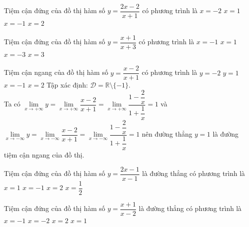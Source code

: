 \begin{ex}%
	Tiệm cận đứng của đồ thị hàm số $y=\dfrac{2x-2}{x+1}$ có phương trình là 
	\choice
	{$x=-2$}
	{$x=1$}
	{\True $x=-1$}
	{$x=2$}
\end{ex}

\begin{ex}%
	Tiệm cận đứng của đồ thị hàm số $y=\dfrac{x+1}{x+3}$ có phương trình là 
	\choice
	{$x=-1$}
	{$x=1$}
	{\True $x=-3$}
	{$x=3$}
\end{ex}


\begin{ex}%
	Tiệm cận ngang của đồ thị hàm số $y=\dfrac{x-2}{x+1}$ có phương trình là
	\choice
	{$y=-2$}
	{\True $y=1$}
	{$x=-1$}
	{$x=2$}
	\loigiai
	{
		Tập xác định: $\mathscr{D}=\mathbb{R}\setminus \{-1\}$.\\
		Ta có $\lim \limits_{x \to +\infty} y=\lim \limits_{x \to +\infty} \dfrac{x-2}{x+1}=\lim \limits_{x \to +\infty} \dfrac{1-\dfrac{2}{x}}{1+\dfrac{1}{x}}=1$ và $\lim \limits_{x \to -\infty} y=\lim \limits_{x \to -\infty} \dfrac{x-2}{x+1}=\lim \limits_{x \to -\infty} \dfrac{1-\dfrac{2}{x}}{1+\dfrac{1}{x}}=1$ nên đường thẳng $y=1$ là đường tiệm cận ngang của đồ thị.
	}
\end{ex}


\begin{ex}%
	Tiệm cận đứng của đồ thị hàm số $ y=\dfrac{2x-1}{x-1}$ là đường thẳng có phương trình là
	\choice
	{\True $x=1$}
	{$x=-1$}
	{$x=2$}
	{$x=\dfrac{1}{2}$}
\end{ex}

\begin{ex}%
	Tiệm cận đứng của đồ thị hàm số $ y=\dfrac{x+1}{x-2}$ là đường thẳng có phương trình là
	\choice
	{$x=-1$}
	{$x=-2$}
	{\True $x=2$}
	{$x=1$}
\end{ex}


